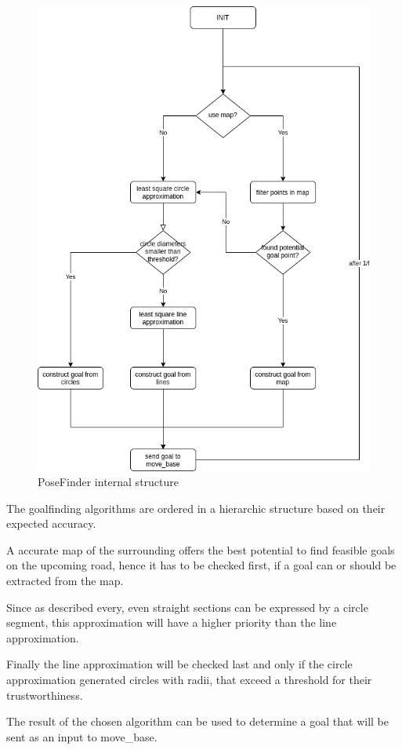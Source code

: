 \begin{figure}[H]
	\centering
	\includegraphics[width=.9\textwidth]{Pictures/posefinder diagram}
	\caption{PoseFinder internal structure}
	\label{posefinder structure}
\end{figure}

The goalfinding algorithms are ordered in a hierarchic structure based on their expected accuracy.

A accurate map of the surrounding offers the best potential to find feasible goals on the upcoming road, hence it has to be checked first, if a goal can or should be extracted from the map.

Since as described every, even straight sections can be expressed by a circle segment, this approximation will have a higher priority than the line approximation.

Finally the line approximation will be checked last and only if the circle approximation generated circles with radii, that exceed a threshold for their trustworthiness.

The result of the chosen algorithm can be used to determine a goal that will be sent as an input to move\_base.

